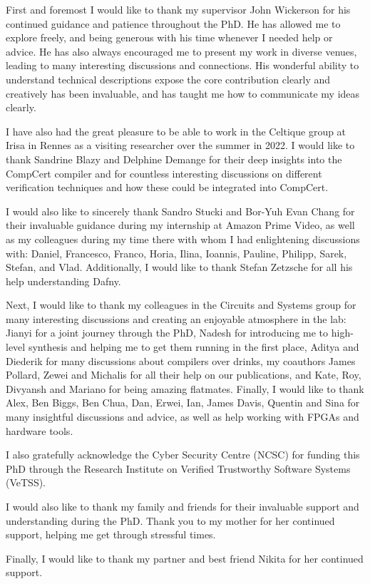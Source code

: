 
First and foremost I would like to thank my supervisor John Wickerson for his
continued guidance and patience throughout the PhD.  He has allowed me to
explore freely, and being generous with his time whenever I needed help or
advice.  He has also always encouraged me to present my work in diverse venues,
leading to many interesting discussions and connections.  His wonderful ability
to understand technical descriptions expose the core contribution clearly and
creatively has been invaluable, and has taught me how to communicate my ideas
clearly.

I have also had the great pleasure to be able to work in the Celtique group at
Irisa in Rennes as a visiting researcher over the summer in 2022.  I would like
to thank Sandrine Blazy and Delphine Demange for their deep insights into the
CompCert compiler and for countless interesting discussions on different
verification techniques and how these could be integrated into CompCert.

I would also like to sincerely thank Sandro Stucki and Bor-Yuh Evan Chang for
their invaluable guidance during my internship at Amazon Prime Video, as well as
my colleagues during my time there with whom I had enlightening discussions
with: Daniel, Francesco, Franco, Horia, Ilina, Ioannis, Pauline, Philipp, Sarek,
Stefan, and Vlad.  Additionally, I would like to thank Stefan Zetzsche for all
his help understanding Dafny.

Next, I would like to thank my colleagues in the Circuits and Systems group for
many interesting discussions and creating an enjoyable atmosphere in the lab:
Jianyi for a joint journey through the PhD, Nadesh for introducing me to
high-level synthesis and helping me to get them running in the first place,
Aditya and Diederik for many discussions about compilers over drinks, my
coauthors James Pollard, Zewei and Michalis for all their help on our
publications, and Kate, Roy, Divyansh and Mariano for being amazing flatmates.
Finally, I would like to thank Alex, Ben Biggs, Ben Chua, Dan, Erwei, Ian, James
Davis, Quentin and Sina for many insightful discussions and advice, as well as
help working with FPGAs and hardware tools.

I also gratefully acknowledge the Cyber Security Centre (NCSC) for funding this
PhD through the Research Institute on Verified Trustworthy Software Systems
(VeTSS).

I would also like to thank my family and friends for their invaluable support
and understanding during the PhD.  Thank you to my mother for her continued
support, helping me get through stressful times.

Finally, I would like to thank my partner and best friend Nikita for her
continued support.


